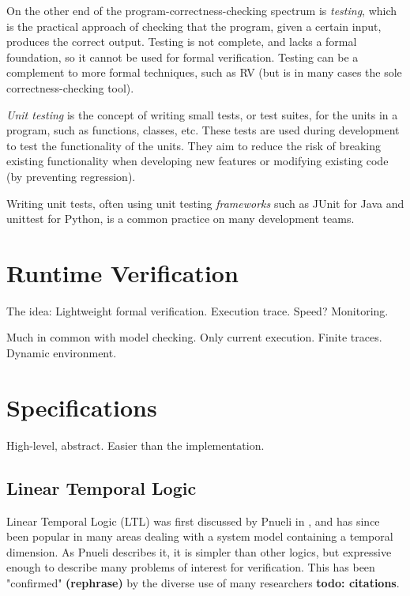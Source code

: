 \documentclass[a4paper,11pt]{kth-mag}
\newcommand{\todo}[1]{\textbf{todo: #1}}
\newcommand{\rephrase}{\textbf{(rephrase)} }
\begin{document}
On the other end of the program-correctness-checking spectrum is \emph{testing}, which is the
practical approach of checking that the program, given a certain input, produces the correct output.
Testing is not complete, and lacks a formal foundation, so it cannot be used for formal verification. 
Testing can be a complement to more formal techniques, such as RV (but is in many cases the sole correctness-checking tool).

\textit{Unit testing} is the concept of writing small tests, or test suites, for the units in
a program, such as functions, classes, etc. These tests are used during development to test the 
functionality of the units. They aim to reduce the risk of breaking existing functionality when 
developing new features or modifying existing code (by preventing regression).

Writing unit tests, often using unit testing \textit{frameworks} such as JUnit \cite{junit}
for Java and unittest \cite{python-unittest} for Python, is a common practice on many
development teams.

\section{Runtime Verification}

The idea: Lightweight formal verification. Execution trace. Speed? Monitoring.

Much in common with model checking. Only current execution. Finite traces. Dynamic environment. 

\section{Specifications}

High-level, abstract. Easier than the implementation.

\subsection{Linear Temporal Logic}

Linear Temporal Logic (LTL) was first discussed by Pnueli in \cite{pnueli77}, and has since been
popular in many areas dealing with a system model containing a temporal dimension. As Pnueli
describes it, it is simpler than other logics, but expressive enough to describe many problems
of interest for verification. This has been "confirmed" \rephrase by the diverse use of
many researchers \todo{citations}.
\end{document}
